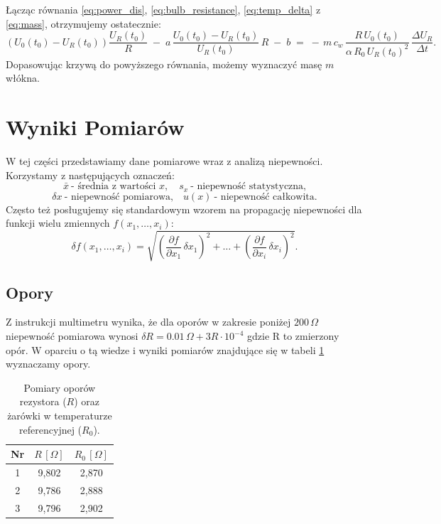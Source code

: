 \documentclass[12pt]{article}
\begin{document}
Łącząc równania \eqref{eq:power_dis}, \eqref{eq:bulb_resistance}, \eqref{eq:temp_delta} z \eqref{eq:mass}, otrzymujemy ostatecznie:
\begin{equation}
    (U_0(t_0) - U_R(t_0))\frac{U_R(t_0)}{R}
    \;-\;
    a\,\frac{U_0(t_0) - U_R(t_0)}{U_R(t_0)}\,R
    \;-\; b
    \;=\;
    -\,m\,c_w\,\frac{R\,U_0(t_0)}{\alpha\,R_0\,U_R(t_0)^2}\,\frac{\Delta U_R}{\Delta t}.
    \label{eq:final}
\end{equation}
Dopasowując krzywą do powyższego równania, możemy wyznaczyć masę $m$ włókna.

\section{Wyniki Pomiarów}
W tej części przedstawiamy dane pomiarowe wraz z analizą niepewności.  
Korzystamy z następujących oznaczeń:  
\[
    \bar{x} \ \text{- średnia z wartości }x,\quad s_x \ \text{- niepewność statystyczna,}
\]
\[
    \delta x \ \text{- niepewność pomiarowa,}\quad u(x) \ \text{- niepewność całkowita.}
\]
Często też posługujemy się standardowym wzorem na propagację niepewności dla funkcji wielu zmiennych $f(x_1,\ldots,x_i)$:
\begin{equation}
    \delta f(x_1,\ldots,x_i)
    = \sqrt{\left(\frac{\partial f}{\partial x_1}\,\delta x_1\right)^2 + \dots + \left(\frac{\partial f}{\partial x_i}\,\delta x_i\right)^2}.
    \label{eq:error_propagation}
\end{equation}

\subsection{Opory}
Z instrukcji multimetru \cite{multimeter} wynika, że dla oporów w zakresie poniżej $200\,\Omega$ niepewność pomiarowa wynosi $\delta R =0.01\,\Omega + 3R\cdot10^{-4}$ gdzie R to zmierzony opór.
W oparciu o tą wiedze i wyniki pomiarów znajdujące się w tabeli \ref{tab:opory} wyznaczamy opory.
\begin{table}[H]
    \centering
    \begin{tabular}{c|cc}
        \toprule
        \textbf{Nr} & $R \, [\Omega]$ & $R_0 \, [\Omega]$ \\
        \midrule
        1 & 9{,}802  & 2{,}870 \\
        2 & 9{,}786  & 2{,}888 \\
        3 & 9{,}796  & 2{,}902 \\
        \bottomrule
    \end{tabular}
    \caption{Pomiary oporów rezystora ($R$) oraz żarówki w temperaturze referencyjnej ($R_0$).}
    \label{tab:opory}
\end{table}
\end{document}
